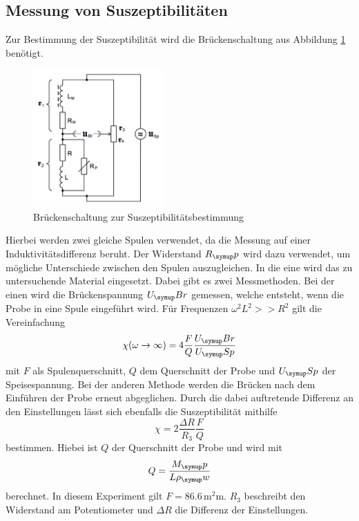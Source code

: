 \subsection{Messung von Suszeptibilitäten}
Zur Bestimmung der Suszeptibilität wird die Brückenschaltung aus Abbildung
\ref{fig:schaltung} benötigt.
\begin{figure}
  \centering
  \includegraphics[width=5cm]{bilder/schaltung.png}
  \caption{Brückenschaltung zur Suszeptibilitätsbestimmung \cite{606}}
  \label{fig:schaltung}
\end{figure}
Hierbei werden zwei gleiche Spulen verwendet, da die Messung auf einer
Induktivitätsdifferenz beruht. Der Widerstand $R_\su{p}$ wird dazu verwendet,
um mögliche Unterschiede zwischen den Spulen auszugleichen. In die eine wird das
zu untersuchende
Material eingesetzt. Dabei gibt es zwei Messmethoden. Bei der einen wird die
Brückenspannung $U_\su{Br}$ gemessen, welche entsteht, wenn die Probe in eine
Spule eingeführt wird. Für Frequenzen $\omega^2L^2 >>R^2$ gilt die Vereinfachung
\begin{equation}
 \chi (\omega \to \infty) = 4 \frac{F}{Q}\frac{U_\su{Br}}{U_\su{Sp}}
\end{equation}
mit $F$ als Spulenquerschnitt, $Q$ dem Querschnitt der Probe und $U_\su{Sp}$ der
Speisespannung.
Bei der anderen Methode werden die Brücken nach dem Einführen der Probe erneut
abgeglichen. Durch die dabei auftretende Differenz an den Einstellungen
lässt sich ebenfalls die Suszeptibilität mithilfe
\begin{equation}
 \chi = 2\frac{\Delta R}{R_3}\frac{F}{Q}
 \label{eqn:suszep}
\end{equation}
bestimmen. Hiebei ist $Q$ der Querschnitt der Probe und wird mit
\begin{equation}
  Q=\frac{M_\su{p}}{L\rho_\su{w}}
\end{equation}
berechnet. In diesem Experiment gilt $F = 86.6 \,\si{\square\milli\meter}$.
 $R_3$ beschreibt den Widerstand am Potentiometer und $\Delta R$ die
Differenz der Einstellungen.

